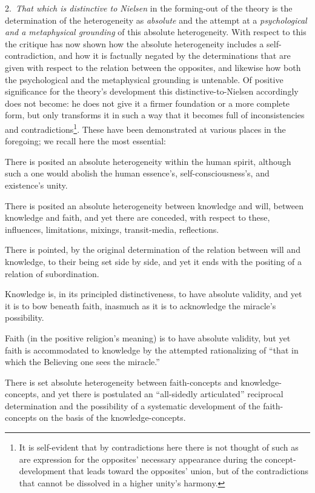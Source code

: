 \documentclass[12pt,a4paper]{book}
\begin{document}
2.~\emph{That which is distinctive to Nielsen} in the forming-out of the theory is the determination
of the heterogeneity as \emph{absolute} and the attempt at a \emph{psychological and a metaphysical
grounding} of this absolute heterogeneity. With respect to this the critique has now shown how the
absolute heterogeneity includes a self-contradiction, and how it is factually negated by the
determinations that are given with respect to the relation between the opposites, and likewise how
both the psychological and the metaphysical grounding is untenable. Of positive significance for the
theory's development this distinctive-to-Nielsen accordingly does not become: he does not give it a
firmer foundation or a more complete form, but only transforms it in such a way that it becomes full
of inconsistencies and contradictions\footnote{It is self-evident that by contradictions here there is
not thought of such as are expression for the opposites' necessary appearance during the
concept-development that leads toward the opposites' union, but of the contradictions that cannot be
dissolved in a higher unity's harmony.}. These have been demonstrated at various places in the
foregoing; we recall here the most essential:

There is posited an absolute heterogeneity within the human spirit, although such a one would abolish
the human essence's, self-consciousness's, and existence's unity.

There is posited an absolute heterogeneity between knowledge and will, between knowledge and faith,
and yet there are conceded, with respect to these, influences, limitations, mixings, transit-media,
reflections.

There is pointed, by the original determination of the relation between will and knowledge, to their
being set side by side, and yet it ends with the positing of a relation of subordination.

Knowledge is, in its principled distinctiveness, to have absolute validity, and yet it is to bow
beneath faith, inasmuch as it is to acknowledge the miracle's possibility.

Faith (in the positive religion's meaning) is to have absolute validity, but yet faith is accommodated
to knowledge by the attempted rationalizing of ``that in which the Believing one sees the miracle.''

There is set absolute heterogeneity between faith-concepts and knowledge-concepts, and yet there is
postulated an ``all-sidedly articulated'' reciprocal determination and the possibility of a systematic
development of the faith-concepts on the basis of the knowledge-concepts.
\end{document}
